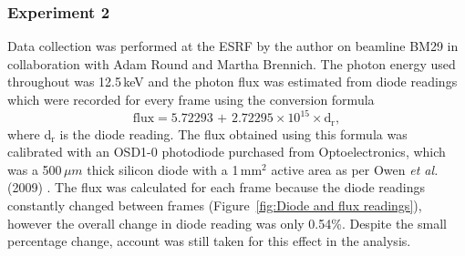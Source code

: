 \subsubsection{Experiment 2}
\label{subs:Experiment 2 - data col}
Data collection was performed at the ESRF by the author on beamline BM29 in collaboration with Adam Round and Martha Brennich.
The photon energy used throughout was 12.5$\,$keV and the photon flux was estimated from diode readings which were recorded for every frame using the conversion formula
\begin{equation}
    \text{flux} = \text{5.72293 + 2.72295} \times \text{10}^{\text{15}} \times \text{d}_{\text{r}},
\end{equation}
where d$_{\text{r}}$ is the diode reading.
The flux obtained using this formula was calibrated with an OSD1-0 photodiode purchased from Optoelectronics, which was a 500$\,\mu m$ thick silicon diode with a 1$\,$mm$^{\text{2}}$ active area as per Owen \textit{et al.} (2009) \nocite{owen2009}.
The flux was calculated for each frame because the diode readings constantly changed between frames (Figure~\ref{fig:Diode and flux readings}), however the overall change in diode reading was only 0.54\%.
Despite the small percentage change, account was still taken for this effect in the analysis.
